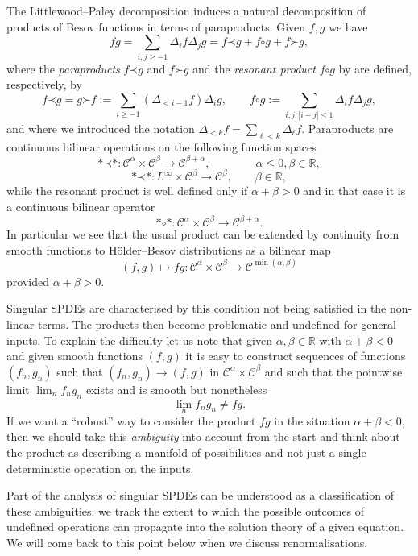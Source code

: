 \documentclass[a4paper, 11pt]{article}
\newcommand{\assign}{:=}
\newcommand{\tmtextit}[1]{{\itshape{#1}}}
\newcommand{\para}{\mathord{\prec}}
\newcommand{\lpara}{\mathord{\succ}}
\newcommand{\reso}{\mathord{\circ}}
\begin{document}
The Littlewood--Paley decomposition induces a natural decomposition of
products of Besov functions in terms of paraproducts. Given $f, g$ we have
\[ fg = \sum_{i, j \geqslant - 1} \Delta_i f \Delta_j g = f \para g + f \reso
   g + f \lpara g, \]
where the \tmtextit{paraproducts} $f \para g$ and $f \lpara g$ and the
\tmtextit{resonant product} $f \reso g$ by are defined, respectively, by
\[ f \para g = g \lpara f \assign \sum_{i \geqslant - 1} (\Delta_{< i - 1} f)
   \Delta_i g, \qquad f \reso g \assign \sum_{i, j : | i - j | \leqslant 1}
   \Delta_i f \Delta_j g, \]
and where we introduced the notation $\Delta_{< k} f = \sum_{\ell < k}
\Delta_{\ell} f$. Paraproducts are continuous bilinear operations on the
following function spaces
\[ \ast \para \ast : \mathcal{C}^{\alpha} \times \mathcal{C}^{\beta}
   \rightarrow \mathcal{C}^{\beta + \alpha}, \qquad \qquad \alpha \leqslant 0,
   \beta \in \mathbb{R}, \]
\[ \ast \para \ast : L^{\infty} \times \mathcal{C}^{\beta} \rightarrow
   \mathcal{C}^{\beta}, \qquad \beta \in \mathbb{R}, \]
while the resonant product is well defined only if $\alpha + \beta > 0$ and in
that case it is a continuous bilinear operator
\[ \ast \reso \ast : \mathcal{C}^{\alpha} \times \mathcal{C}^{\beta}
   \rightarrow \mathcal{C}^{\beta + \alpha} . \]
In particular we see that the usual product  can
be extended by continuity from smooth functions to H{\"o}lder--Besov
distributions as a bilinear map
\[ (f, g) \mapsto fg : \mathcal{C}^{\alpha} \times \mathcal{C}^{\beta}
   \rightarrow \mathcal{C}^{\min (\alpha, \beta)} \]
provided $\alpha + \beta > 0$.

Singular SPDEs are characterised by this condition not being satisfied in the
non-linear terms. The products then become problematic and undefined for
general inputs. To explain the difficulty let us note that given $\alpha,
\beta \in \mathbb{R}$ with $\alpha + \beta < 0$ and given smooth functions
$(f, g)$ it is easy to construct sequences of functions $(f_n, g_n)$ such that
$(f_n, g_n) \rightarrow (f, g)$ in $\mathcal{C}^{\alpha} \times
\mathcal{C}^{\beta}$ and such that the pointwise limit $\lim_n f_n g_n$ exists
and is smooth but nonetheless
\[ \lim_n f_n g_n \neq fg. \]
If we want a ``robust'' way to consider the product $fg$ in the situation
$\alpha + \beta < 0$, then we should take this \tmtextit{ambiguity} into
account from the start and think about the product as describing a manifold of
possibilities and not just a single deterministic operation on the inputs.

Part of the analysis of singular SPDEs can be understood as a classification
of these ambiguities: we track the extent to which the possible outcomes of
undefined operations can propagate into the solution theory of a given
equation. We will come back to this point below when we discuss
renormalisations.
\end{document}
